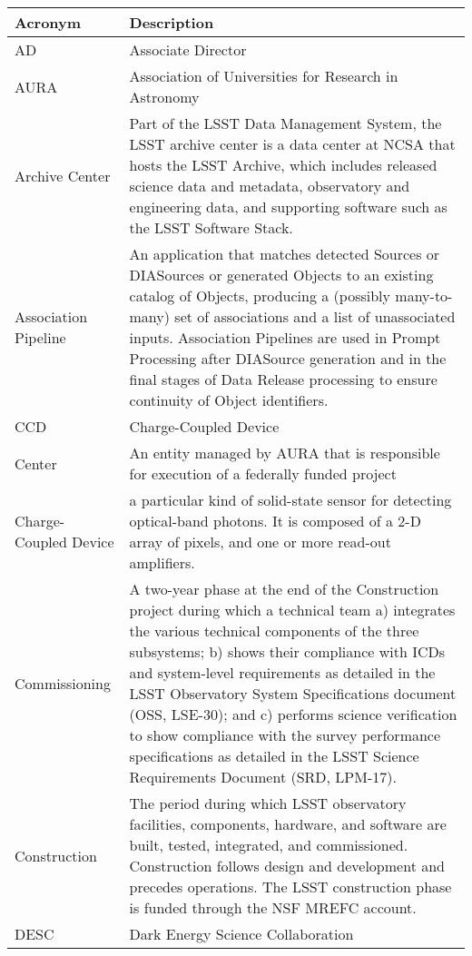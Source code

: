 \addtocounter{table}{-1}
\begin{longtable}{|l|p{}|}\hline
\textbf{Acronym} & \textbf{Description}  \\\hline

AD & Associate Director \\\hline
AURA & \gls{Association of Universities for Research in Astronomy} \\\hline
Archive Center & Part of the LSST Data Management System, the LSST archive center is a data center at NCSA that hosts the LSST Archive, which includes released science data and metadata, observatory and engineering data, and supporting software such as the LSST Software Stack. \\\hline
Association Pipeline & An application that matches detected Sources or DIASources or generated Objects to an existing catalog of Objects, producing a (possibly many-to-many) set of associations and a list of unassociated inputs. Association Pipelines are used in Prompt Processing after DIASource generation and in the final stages of Data Release processing to ensure continuity of Object identifiers. \\\hline
CCD & \gls{Charge-Coupled Device} \\\hline
Center & An entity managed by AURA that is responsible for execution of a federally funded project \\\hline
Charge-Coupled Device & a particular kind of solid-state sensor for detecting optical-band photons. It is composed of a 2-D array of pixels, and one or more read-out amplifiers. \\\hline
Commissioning & A two-year phase at the end of the Construction project during which a technical team a) integrates the various technical components of the three subsystems; b) shows their compliance with ICDs and system-level requirements as detailed in the LSST Observatory System Specifications document (OSS, LSE-30); and c) performs science verification to show compliance with the survey performance specifications as detailed in the LSST Science Requirements Document (SRD, LPM-17). \\\hline
Construction & The period during which LSST observatory facilities, components, hardware, and software are built, tested, integrated, and commissioned. Construction follows design and development and precedes operations. The LSST construction phase is funded through the \gls{NSF} \gls{MREFC} account. \\\hline
DESC & Dark Energy Science Collaboration \\\hline

\end{longtable}
